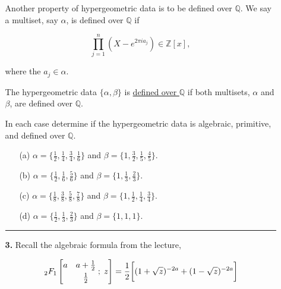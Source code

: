 \documentclass[12pt]{amsart}
\theoremstyle{definition}
\theoremstyle{remark}
\numberwithin{equation}{section}
\def\Z{{\mathbb Z}}
\def\Q{{\mathbb Q}}
\def\Z{\mathbb{Z}}
\def\Q{\mathbb{Q}}
\newcommand*\HYPERskip{&}
\newcommand*\pFq{
\begingroup
\catcode`\,\active
\def ,{\HYPERskip}%
\doHyper
}
\def\doHyper#1#2#3#4#5{%
\, _{#1}F_{#2}\left[\begin{matrix}#3 \smallskip \\  #4\end{matrix} \; ; \; #5\right]%
\endgroup
}
\begin{document}
\begin{itemize}
\begin{itemize}
Another property of hypergeometric data is to be defined over $\Q$. We say a multiset, say $\alpha$, is defined over $\Q$ if 

$$\prod_{j=1}^{n} (X - e^{2 \pi ia_{j}}) \in \Z[x],$$

where the $a_{j} \in \alpha$.

\vspace{4mm}

The hypergeometric data $\{\alpha, \beta\}$ is \underline{defined over $\Q$} if both multisets, $\alpha$ and $\beta$, are defined over $\Q$.

\vspace{4mm}

In each case determine if the hypergeometric data is algebraic, primitive, and defined over $\Q$.

\vspace{4mm}

\begin{itemize}
\item[(a)] $\alpha = \{\frac{1}{2}, \frac{1}{4}, \frac{3}{4}, \frac{1}{6} \}$ and $\beta = \{1, \frac{3}{2}, \frac{1}{5}, \frac{4}{5}\}$.

\vspace{4mm}

\item[(b)] $\alpha = \{ \frac{1}{2}, \frac{1}{6}, \frac{5}{6}\}$ and $\beta = \{1, \frac{1}{3}, \frac{2}{3}\}$.

\vspace{4mm}

\item[(c)] $\alpha = \{\frac{1}{8}, \frac{3}{8}, \frac{5}{8}, \frac{7}{8}\}$ and $\beta = \{1, \frac{1}{2}, \frac{1}{4}, \frac{3}{4}\}$.

\vspace{4mm}

\item[(d)] $\alpha = \{\frac{1}{2}, \frac{1}{3}, \frac{2}{3}\}$ and $\beta = \{1, 1, 1\}$.

\end{itemize}

\vspace{8mm}

\hrule{}

\vspace{4mm}

\item[\textbf{3.}] Recall the algebraic formula from the lecture,

$$\pFq{2}{1}{a & a+\frac{1}{2}}{&\frac{1}{2}}{z} = \frac{1}{2} \bigg[(1 + \sqrt{z})^{-2a} + (1 - \sqrt{z})^{-2a} \bigg]$$


\end{itemize}
\end{itemize}
\end{document}
